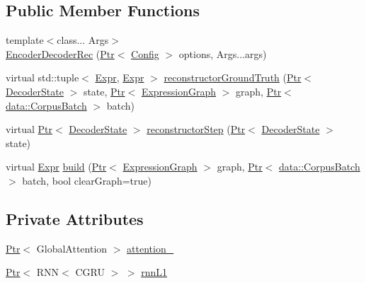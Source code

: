 \subsection*{Public Member Functions}
\begin{DoxyCompactItemize}
\item 
{\footnotesize template$<$class... Args$>$ }\\\hyperlink{classmarian_1_1EncoderDecoderRec_ac541f4c3e2d0ae1882bd3f515cb5273e}{Encoder\+Decoder\+Rec} (\hyperlink{namespacemarian_ad1a373be43a00ef9ce35666145137b08}{Ptr}$<$ \hyperlink{classmarian_1_1Config}{Config} $>$ options, Args...\+args)
\item 
virtual std\+::tuple$<$ \hyperlink{namespacemarian_a498d8baf75b754011078b890b39c8e12}{Expr}, \hyperlink{namespacemarian_a498d8baf75b754011078b890b39c8e12}{Expr} $>$ \hyperlink{classmarian_1_1EncoderDecoderRec_a470e9aaddae95fc1a1d5ecaabf06a1fe}{reconstructor\+Ground\+Truth} (\hyperlink{namespacemarian_ad1a373be43a00ef9ce35666145137b08}{Ptr}$<$ \hyperlink{classmarian_1_1DecoderState}{Decoder\+State} $>$ state, \hyperlink{namespacemarian_ad1a373be43a00ef9ce35666145137b08}{Ptr}$<$ \hyperlink{classmarian_1_1ExpressionGraph}{Expression\+Graph} $>$ graph, \hyperlink{namespacemarian_ad1a373be43a00ef9ce35666145137b08}{Ptr}$<$ \hyperlink{classmarian_1_1data_1_1CorpusBatch}{data\+::\+Corpus\+Batch} $>$ batch)
\item 
virtual \hyperlink{namespacemarian_ad1a373be43a00ef9ce35666145137b08}{Ptr}$<$ \hyperlink{classmarian_1_1DecoderState}{Decoder\+State} $>$ \hyperlink{classmarian_1_1EncoderDecoderRec_ac3a359e69278e31f475f4e6b6acf88e4}{reconstructor\+Step} (\hyperlink{namespacemarian_ad1a373be43a00ef9ce35666145137b08}{Ptr}$<$ \hyperlink{classmarian_1_1DecoderState}{Decoder\+State} $>$ state)
\item 
virtual \hyperlink{namespacemarian_a498d8baf75b754011078b890b39c8e12}{Expr} \hyperlink{classmarian_1_1EncoderDecoderRec_a5d7be4c554cdd6752a8ee5964ff116c2}{build} (\hyperlink{namespacemarian_ad1a373be43a00ef9ce35666145137b08}{Ptr}$<$ \hyperlink{classmarian_1_1ExpressionGraph}{Expression\+Graph} $>$ graph, \hyperlink{namespacemarian_ad1a373be43a00ef9ce35666145137b08}{Ptr}$<$ \hyperlink{classmarian_1_1data_1_1CorpusBatch}{data\+::\+Corpus\+Batch} $>$ batch, bool clear\+Graph=true)
\end{DoxyCompactItemize}
\subsection*{Private Attributes}
\begin{DoxyCompactItemize}
\item 
\hyperlink{namespacemarian_ad1a373be43a00ef9ce35666145137b08}{Ptr}$<$ Global\+Attention $>$ \hyperlink{classmarian_1_1EncoderDecoderRec_ad4768d4a33e83b3fc280f666df286269}{attention\+\_\+}
\item 
\hyperlink{namespacemarian_ad1a373be43a00ef9ce35666145137b08}{Ptr}$<$ R\+NN$<$ C\+G\+RU $>$ $>$ \hyperlink{classmarian_1_1EncoderDecoderRec_ad0d471b436beab644c14a8b692a4d53f}{rnn\+L1}
\end{DoxyCompactItemize}
